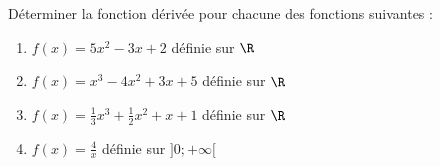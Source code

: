 \documentclass[1,exos,b,prof,e]{phBook}
\begin{document}







\begin{exercice}
	Déterminer la fonction dérivée pour chacune des fonctions suivantes :
	\begin{enumerate}
		\item $f(x)=5x^2-3x+2$ définie sur $\R$
		\item $f(x)=x^3-4x^2+3x+5$ définie sur $\R$
		\item $f(x)=\frac{1}{3}x^3+\frac{1}{2}x^2+x+1$ définie sur $\R$
		\item $f(x)=\frac{4}{x}$ définie sur $]0;+\infty[$
	\end{enumerate}



\end{exercice}
\end{document}
